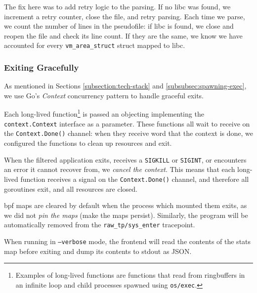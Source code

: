 The fix here was to add retry logic to the parsing. If no \ac{libc} was found,
we increment a retry counter, close the file, and retry parsing. Each time
we parse, we count the number of lines in the pseudofile: if \ac{libc} is found,
we close and reopen the file and check its line count. If they are the
same, we know we have accounted for every \texttt{vm\_area\_struct} struct 
mapped to \ac{libc}.


\subsubsection{Exiting Gracefully}

As mentioned in Sections \ref{subsection:tech-stack} and 
\ref{subsubsec:spawning-exec}, we use Go's \textit{Context} concurrency pattern
to handle graceful exits. 

Each long-lived function\footnote{Examples of long-lived functions are functions
that read from ringbuffers in an infinite loop and child processes spawned using
\texttt{os/exec}.} is passed an objecting implementing the 
\texttt{context.Context} interface as a parameter. These functions all wait to
receive on the \texttt{Context.Done()} channel: when they receive word that the
context is done, we configured the functions to clean up resources and exit. 

When the filtered application exits, receives a \texttt{SIGKILL} or 
\texttt{SIGINT}, or \af encounters an error it cannot recover from, we 
\textit{cancel the context}. This means that each long-lived function receives 
a signal on the \texttt{Context.Done()} channel, and therefore all goroutines 
exit, and all resources are closed.

\ac{bpf} maps are cleared by default when the process which mounted them exits,
as we did not \textit{pin the maps} (make the maps persist). Similarly, the \af
program will be automatically removed from the \texttt{raw\_tp/sys\_enter}
tracepoint.

When running in \texttt{--verbose} mode, the frontend will read the contents of
the stats map before exiting and dump its contents to \ac{stdout} as JSON.


